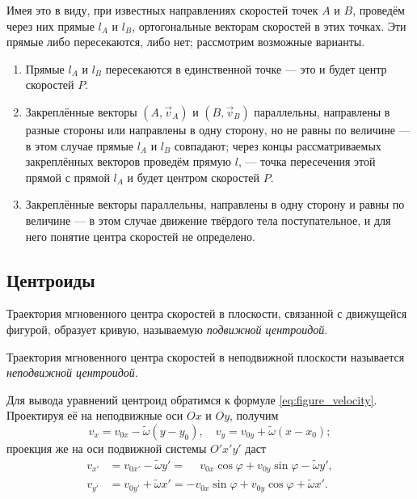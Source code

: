 Имея это в виду, при известных направлениях скоростей точек $A$ и $B$, проведём
через них прямые $l_A$ и $l_B$, ортогональные векторам скоростей в этих точках.
Эти прямые либо пересекаются, либо нет; рассмотрим возможные варианты.
\begin{enumerate}
  \item Прямые $l_A$ и $l_B$ пересекаются в единственной точке --- это и будет
    центр скоростей $P$.

  \item Закреплённые векторы $(A, \vec{v}_A)$ и $(B, \vec{v}_B)$ параллельны,
    направлены в разные стороны или направлены в одну сторону, но не равны по
    величине --- в этом случае прямые $l_A$ и $l_B$ совпадают; через концы
    рассматриваемых закреплённых векторов проведём прямую $l$, --- точка
    пересечения этой прямой с прямой $l_A$ и будет центром скоростей $P$.

  \item Закреплённые векторы параллельны, направлены в одну сторону и равны по
    величине --- в этом случае движение твёрдого тела поступательное, и для него
    понятие центра скоростей не определено.
\end{enumerate}

\subsection{Центроиды}

\begin{definition}
  Траектория мгновенного центра скоростей в плоскости, связанной с движущейся
  фигурой, образует кривую, называемую \textit{подвижной центроидой}.
\end{definition}

\begin{definition}
  Траектория мгновенного центра скоростей в неподвижной плоскости называется
  \textit{неподвижной центроидой}.
\end{definition}

Для вывода уравнений центроид обратимся к формуле \ref{eq:figure_velocity}.
Проектируя её на неподвижные оси $Ox$ и $Oy$, получим
\begin{equation}
  \label{eq:velocity_immovable_projection}
  v_x = v_{0x} - \tilde{\omega} (y - y_0), \quad
  v_y = v_{0y} + \tilde{\omega} (x - x_0);
\end{equation}
проекция же на оси подвижной системы $O'x'y'$ даст
\begin{equation}
  \label{eq:velocity_movable_projection}
  \begin{aligned}
    v_{x'} &= v_{0x'} - \tilde{\omega} y' = \phantom{-}v_{0x} \cos\varphi +
      v_{0y} \sin\varphi - \tilde{\omega} y', \\
    v_{y'} &= v_{0y'} + \tilde{\omega} x' = -v_{0x} \sin\varphi + v_{0y}
      \cos\varphi + \tilde{\omega} x'.
  \end{aligned}
\end{equation}

